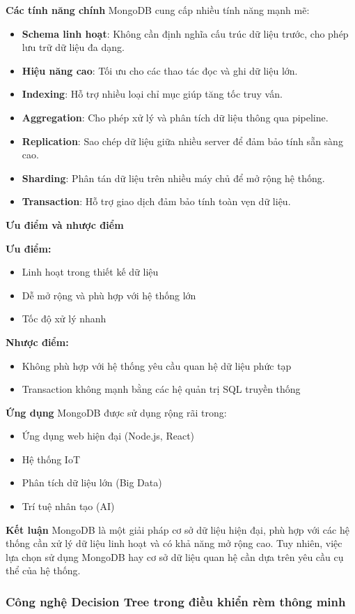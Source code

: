 \textbf{Các tính năng chính} 
MongoDB cung cấp nhiều tính năng mạnh mẽ:
\begin{itemize}
    \item \textbf{Schema linh hoạt}: Không cần định nghĩa cấu trúc dữ liệu trước, cho phép lưu trữ dữ liệu đa dạng.
    \item \textbf{Hiệu năng cao}: Tối ưu cho các thao tác đọc và ghi dữ liệu lớn.
    \item \textbf{Indexing}: Hỗ trợ nhiều loại chỉ mục giúp tăng tốc truy vấn.
    \item \textbf{Aggregation}: Cho phép xử lý và phân tích dữ liệu thông qua pipeline.
    \item \textbf{Replication}: Sao chép dữ liệu giữa nhiều server để đảm bảo tính sẵn sàng cao.
    \item \textbf{Sharding}: Phân tán dữ liệu trên nhiều máy chủ để mở rộng hệ thống.
    \item \textbf{Transaction}: Hỗ trợ giao dịch đảm bảo tính toàn vẹn dữ liệu.
\end{itemize}

\textbf{Ưu điểm và nhược điểm} 

\textbf{Ưu điểm:}
\begin{itemize}
    \item Linh hoạt trong thiết kế dữ liệu
    \item Dễ mở rộng và phù hợp với hệ thống lớn
    \item Tốc độ xử lý nhanh
\end{itemize}

\textbf{Nhược điểm:}
\begin{itemize}
    \item Không phù hợp với hệ thống yêu cầu quan hệ dữ liệu phức tạp
    \item Transaction không mạnh bằng các hệ quản trị SQL truyền thống
\end{itemize}

\textbf{Ứng dụng} 
MongoDB được sử dụng rộng rãi trong:
\begin{itemize}
    \item Ứng dụng web hiện đại (Node.js, React)
    \item Hệ thống IoT
    \item Phân tích dữ liệu lớn (Big Data)
    \item Trí tuệ nhân tạo (AI)
\end{itemize}

\textbf{Kết luận} 
MongoDB là một giải pháp cơ sở dữ liệu hiện đại, phù hợp với các hệ thống cần xử lý dữ liệu linh hoạt và có khả năng mở rộng cao. Tuy nhiên, việc lựa chọn sử dụng MongoDB hay cơ sở dữ liệu quan hệ cần dựa trên yêu cầu cụ thể của hệ thống.\subsubsection{Công nghệ Decision Tree trong điều khiển rèm thông minh}

